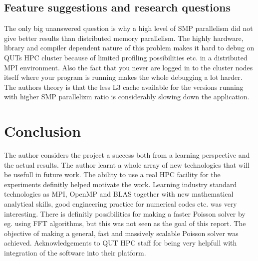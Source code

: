 \documentclass{article}
\begin{document}
\subsection{Feature suggestions and research questions}
The only big unanswered question is why a high level of SMP parallelism did not give better
results than distributed memory parallelism. The highly hardware,
library and compiler dependent nature of this problem makes it hard
to debug on QUTs HPC cluster because of limited profiling possibilities
etc. in a distributed MPI environment. Also the fact that you never are
logged in to the cluster nodes itself where your program is running makes
the whole debugging a lot harder. The authors theory is that the less L3
cache available for the versions running with higher SMP parallelizm ratio
is considerably slowing down the application.

\section{Conclusion}
The author considers the project a success both from a learning perspective and
the actual results. The author learnt a whole array of new technologies that
will be usefull in future work. The ability to use a real HPC facility for the
experiments definitly helped motivate the work. Learning industry
standard technologies as MPI, OpenMP and BLAS together with new mathematical
analytical skills, good engineering practice for numerical codes etc. was
very interesting. There is definitly possibilities for making a faster Poisson
solver by eg. using FFT algorithms, but this was not seen as the goal of
this report. The objective of making a general, fast and massively scalable
Poisson solver was achieved. Acknowledgements to QUT HPC staff for being
very helpfull with integration of the software into their platform.
\end{document}

